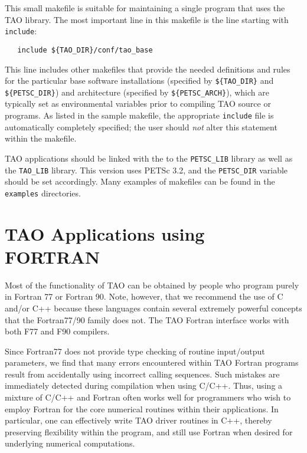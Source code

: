 This small makefile is suitable for maintaining a single program that
uses the TAO library.  The most important line in this makefile is the
line starting with {\tt include}:

\begin{verbatim}
   include ${TAO_DIR}/conf/tao_base
\end{verbatim}
\noindent %
This line includes other makefiles that provide the needed definitions
and rules for the particular base software installations (specified by
{\tt \$\{TAO\_DIR\}} and {\tt \$\{PETSC\_DIR\}}) and architecture
(specified by {\tt \$\{PETSC\_ARCH\}}), which are typically set as
environmental variables prior to compiling TAO source or programs.  As
listed in the sample makefile, the appropriate {\tt include} file is
automatically completely specified; the user should {\em not} alter
this statement within the makefile.
 
TAO applications should be linked with the
to the {\tt PETSC\_LIB} library
as well as the {\tt TAO\_LIB} library. This version uses
PETSc 3.2, and the {\tt PETSC\_DIR} variable
should be set accordingly.  Many examples of makefiles
can be found in the {\tt examples} directories.


\section{TAO Applications using FORTRAN}
\label{chapter:fortran}
Most of the functionality of TAO can be obtained by people who program
purely in Fortran 77 or Fortran 90.  Note, however, that we recommend
the use of C and/or C++ because these languages contain several
extremely powerful concepts that the Fortran77/90 family does not.
The TAO Fortran interface works with both F77 and F90 compilers.

Since Fortran77 does not provide type checking of routine input/output
parameters, we find that many errors encountered within TAO Fortran
programs result from accidentally using incorrect calling sequences.
Such mistakes are immediately detected during compilation when using
C/C++.  Thus, using a mixture of C/C++ and Fortran often works well
for programmers who wish to employ Fortran for the core numerical
routines within their applications.  In particular, one can
effectively write TAO driver routines in C++, thereby preserving
flexibility within the program, and still use Fortran when desired for
underlying numerical computations.


